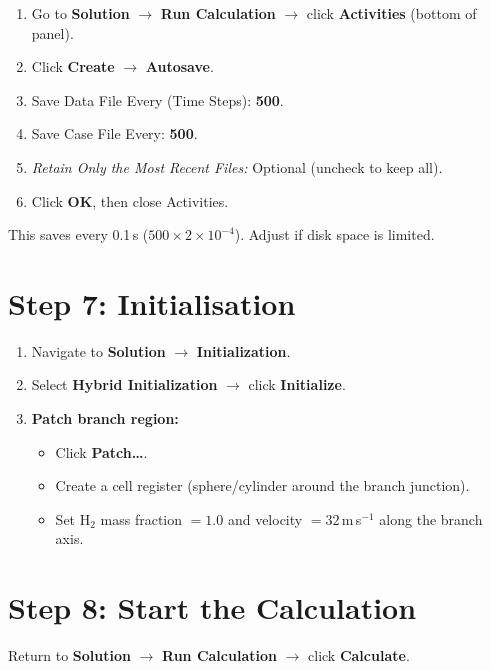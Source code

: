 \documentclass[12pt,a4paper]{report}
\begin{document}
\begin{enumerate}
  \item Go to \textbf{Solution} $\rightarrow$ \textbf{Run Calculation}
        $\rightarrow$ click \textbf{Activities} (bottom of panel).
  \item Click \textbf{Create} $\rightarrow$ \textbf{Autosave}.
  \item Save Data File Every (Time Steps): \textbf{500}.
  \item Save Case File Every: \textbf{500}.
  \item \textit{Retain Only the Most Recent Files:} Optional (uncheck
        to keep all).
  \item Click \textbf{OK}, then close Activities.
\end{enumerate}

\noindent This saves every 0.1\,s ($500 \times 2\times10^{-4}$).
Adjust if disk space is limited.

\section{Step 7: Initialisation}

\begin{enumerate}
  \item Navigate to \textbf{Solution} $\rightarrow$
        \textbf{Initialization}.
  \item Select \textbf{Hybrid Initialization} $\rightarrow$ click
        \textbf{Initialize}.
  \item \textbf{Patch branch region:}
  \begin{itemize}
    \item Click \textbf{Patch\ldots}.
    \item Create a cell register (sphere/cylinder around the branch
          junction).
    \item Set H$_2$ mass fraction $= 1.0$ and velocity $= 32$\,m\,s$^{-1}$
          along the branch axis.
  \end{itemize}
\end{enumerate}

\section{Step 8: Start the Calculation}

Return to \textbf{Solution} $\rightarrow$ \textbf{Run Calculation}
$\rightarrow$ click \textbf{Calculate}.
\end{document}
